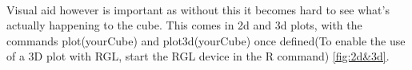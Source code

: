 \documentclass{article}
\begin{document}
\paragraph{}
Visual aid however is important as without this it becomes hard to see what's actually happening to the cube. This comes in 2d and 3d plots, with the commands plot(yourCube) and plot3d(yourCube) once defined(To enable the use of a 3D plot with RGL, start the RGL device in the R command) \ref{fig:2d&3d}.
\end{document}
